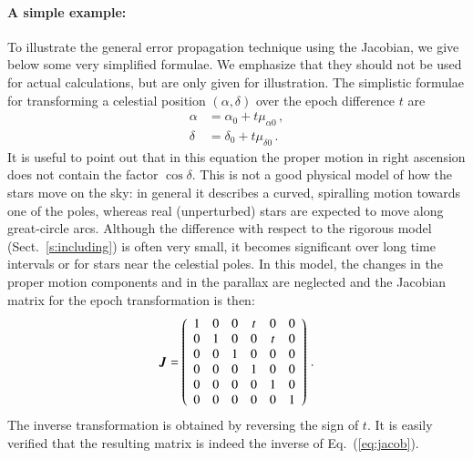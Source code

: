 \documentclass{aa}
\def\vec#1{\ensuremath{\mathchoice{\mbox{\boldmath$\displaystyle#1$}}
{\mbox{\boldmath$\textstyle#1$}}
{\mbox{\boldmath$\scriptstyle#1$}}
{\mbox{\boldmath$\scriptscriptstyle#1$}}}}
\begin{document}
\paragraph{A simple example:}

To illustrate the general error propagation technique using the Jacobian, we give below some very
simplified formulae. We emphasize that they should not be used for actual calculations,
but are only given for illustration.
The simplistic formulae for transforming a celestial position $\left(\alpha,\delta\right)$ over the epoch
difference $t$ are
\begin{equation}\label{eq:simplified}
 \begin{aligned}
  \alpha &=\alpha_0+t\mu_{\alpha0}\,,\\
  \delta &=\delta_0+t\mu_{\delta0}\,.
 \end{aligned}
\end{equation}
It is useful to point out that in this equation the proper motion in right ascension does not contain
the factor $\cos\delta$. This is not a good physical model of how the stars move on the sky: in
general it describes a curved, spiralling motion towards one of the poles, whereas real (unperturbed)
stars are expected to move along great-circle arcs. Although the difference with respect to the
rigorous model (Sect.~\ref{s:including}) is often very small, it becomes significant over long time
intervals or for stars near the celestial poles. In this model, the changes in the proper motion
components and in the parallax are neglected and the Jacobian matrix for the epoch transformation
is then:
\begin{equation}\label{eq:jacob}
 \vec{J}=
 \left(
 \begin{array}{cccccc}
  1 & 0 & 0 & t & 0 & 0 \\
  0 & 1 & 0 & 0 & t & 0 \\
  0 & 0 & 1 & 0 & 0 & 0 \\
  0 & 0 & 0 & 1 & 0 & 0 \\
  0 & 0 & 0 & 0 & 1 & 0 \\
  0 & 0 & 0 & 0 & 0 & 1
 \end{array}
 \right)\,.
\end{equation}
The inverse transformation is obtained by reversing the sign of $t$. It is
easily verified that the resulting matrix is indeed the inverse of Eq.~(\ref{eq:jacob}).
\end{document}
